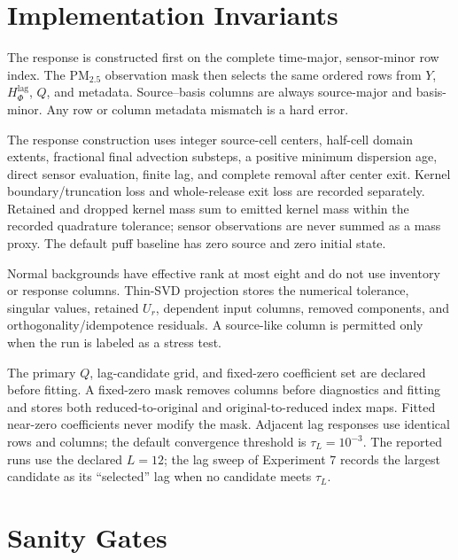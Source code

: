 \section{Implementation Invariants}
\label{app:implementation_invariants}

The response is constructed first on the complete time-major, sensor-minor row
index.  The PM\(_{2.5}\) observation mask then selects the same ordered rows
from \(Y\), \(H_\Phi^{\mathrm{lag}}\), \(Q\), and metadata.  Source--basis
columns are always source-major and basis-minor.  Any row or column metadata
mismatch is a hard error.

The response construction uses integer source-cell centers, half-cell domain
extents, fractional final advection substeps, a positive minimum dispersion
age, direct sensor evaluation, finite lag, and complete removal after center
exit.  Kernel boundary/truncation loss and whole-release exit loss are recorded
separately.  Retained and dropped kernel mass sum to emitted kernel mass within
the recorded quadrature tolerance; sensor observations are never summed as a
mass proxy.  The default puff baseline has zero source and zero initial state.

Normal backgrounds have effective rank at most eight and do not use inventory
or response columns.  Thin-SVD projection stores the numerical tolerance,
singular values, retained \(U_r\), dependent input columns, removed components,
and orthogonality/idempotence residuals.  A source-like column is permitted only
when the run is labeled as a stress test.

The primary \(Q\), lag-candidate grid, and fixed-zero coefficient set are
declared before fitting.  A fixed-zero mask removes columns before diagnostics
and fitting and stores both reduced-to-original and original-to-reduced index
maps.  Fitted near-zero coefficients never modify the mask.  Adjacent lag
responses use identical rows and columns; the default convergence threshold is
\(\tau_L=10^{-3}\).  The reported runs use the declared \(L=12\); the lag sweep of
Experiment 7 records the largest candidate as its ``selected'' lag when no candidate
meets \(\tau_L\).

\section{Sanity Gates}
\label{app:sanity_gates}

